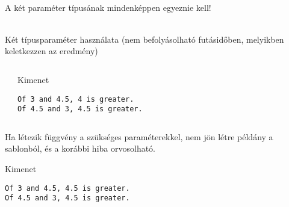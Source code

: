 \documentclass[usenames,dvipsnames,aspectratio=169]{beamer}
\begin{document}
\begin{frame}
    \begin{description}[m]
        \item[Probléma:] \hfill \\ A két paraméter típusának mindenképpen egyeznie kell!
        \item[Félmegoldás:] \hfill \\ Két típusparaméter használata (nem befolyásolható futásidőben, melyikben keletkezzen az eredmény)  
    \end{description}
\end{frame}

\begin{frame}[fragile]
    \begin{columns}[T]
            \begin{exampleblock}{}
                \scriptsize
                
            \end{exampleblock}
            \begin{block}{Kimenet}
                \footnotesize
                \vspace{-.4cm}
                \begin{verbatim}
Of 3 and 4.5, 4 is greater.
Of 4.5 and 3, 4.5 is greater.                    
                \end{verbatim}
                \vspace{-.4cm}
            \end{block}
    \end{columns}
\end{frame}

\begin{frame}[fragile]
    Ha létezik függvény a szükséges paraméterekkel, nem jön létre példány a sablonból, és a korábbi hiba orvosolható.
    \begin{exampleblock}{}
        \scriptsize
        
    \end{exampleblock}
    \begin{block}{Kimenet}
        \footnotesize
        \vspace{-.4cm}
        \begin{verbatim}
Of 3 and 4.5, 4.5 is greater.
Of 4.5 and 3, 4.5 is greater.
        \end{verbatim}
        \vspace{-.4cm}
    \end{block}
\end{frame}
\end{document}
